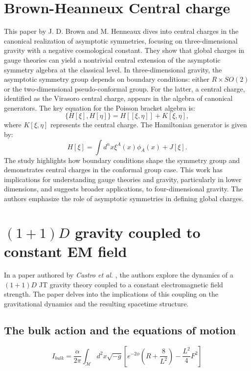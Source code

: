 \section{Brown-Heanneux Central charge \cite{Brown:1986nw}}
This paper by J. D. Brown and M. Henneaux dives into central charges in the canonical realization of asymptotic symmetries, focusing on three-dimensional gravity with a negative cosmological constant. They show that global charges in gauge theories can yield a nontrivial central extension of the asymptotic symmetry algebra at the classical level. In three-dimensional gravity, the asymptotic symmetry group depends on boundary conditions: either $R \times SO(2)$ or the two-dimensional pseudo-conformal group. For the latter, a central charge, identified as the Virasoro central charge, appears in the algebra of canonical generators. The key equation for the Poisson bracket algebra is:
\begin{equation}
\{H[\xi], H[\eta]\} = H[[\xi, \eta]] + K[\xi, \eta],
\end{equation}
where $K[\xi, \eta]$ represents the central charge. The Hamiltonian generator is given by:
\begin{equation}
H[\xi] = \int d^n x \xi^A(x) \phi_A(x) + J[\xi].
\end{equation}
The study highlights how boundary conditions shape the symmetry group and demonstrates central charges in the conformal group case. This work has implications for understanding gauge theories and gravity, particularly in lower dimensions, and suggests broader applications, to four-dimensional gravity. The authors emphasize the role of asymptotic symmetries in defining global charges.

\section{$(1+1)D$ gravity coupled to constant EM field  \cite{Castro:2008ne}}
\label{castro-paper}

In a paper authored by \textit{Castro et al.} \cite{Castro:2008ne}, the authors explore the dynamics of a $(1+1)D$ JT gravity theory coupled to a constant electromagnetic field strength. The paper delves into the implications of this coupling on the gravitational dynamics and the resulting spacetime structure. 

\subsection{The bulk action and the equations of motion}
\[ I_{bulk} = \frac{\alpha}{2\pi}\int_{\mathcal{M}}^{} d^2x \sqrt{-g}\left [ e^{-2\phi} \left ( R + \frac{8}{L^2} \right ) - \frac{L^2}{4}F^2 \right]\]

